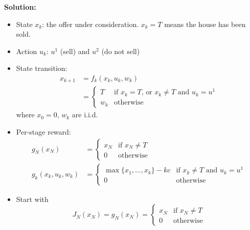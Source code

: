 \documentclass{article}
\begin{document}
    \textbf{Solution:}
    \begin{itemize}
        \item State $x_k$: the offer under consideration. $x_k=T$ means the house has been sold.
        \item Action $u_k$: $u^1$ (sell) and $u^2$ (do not sell)
        \item State transition:
            \begin{equation*}
               \begin{split}
                    x_{k+1} &=f_k(x_k,u_k,w_k)\\
                    &=\begin{cases}
                        T&\text{if $x_k=T$, or $x_k\neq T$ and $u_k=u^1$}\\
                        w_k &\text{otherwise}
                    \end{cases}
               \end{split}
            \end{equation*}
            where $x_0=0$, $w_k$ are i.i.d.
        \item Per-stage reward:
            \begin{equation*}
                \begin{aligned}
                    g_N(x_N)&=\begin{cases}
                        x_N & \text{if $x_N\neq T$}\\
                        0 & \text{otherwise}
                    \end{cases}\\
                    g_k(x_k,u_k,w_k)&=\begin{cases}
                        \max\{x_1,\dots,x_k\}-kc & \text{if $x_k\neq T$ and $u_k=u^1$}\\
                        0 & \text{otherwise}
                    \end{cases}
                \end{aligned}
            \end{equation*}
        \item Start with
            \begin{equation*}
                J_N(x_N)=g_N(x_N)=\begin{cases}
                    x_N & \text{if $x_N\neq T$}\\
                    0 & \text{otherwise}
                \end{cases}
            \end{equation*}

\end{itemize}
\end{document}

